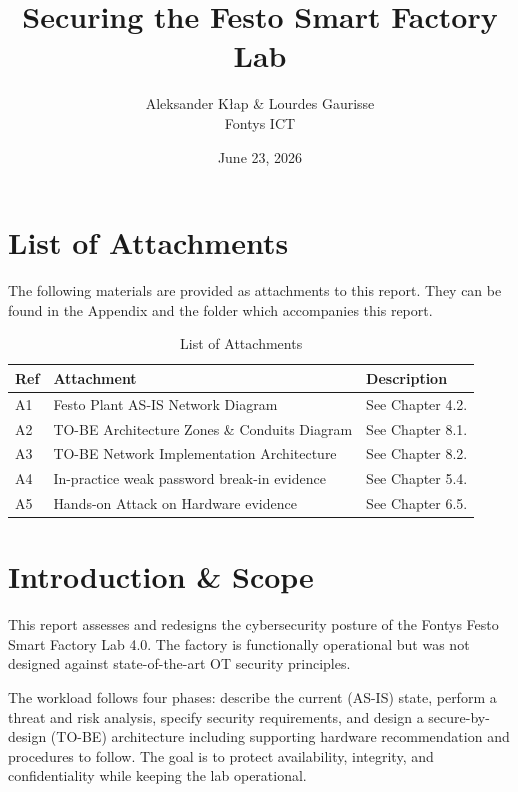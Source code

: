 \documentclass[11pt,a4paper]{article}
\title{\textbf{Securing the Festo Smart Factory Lab}\\[2pt]}
\author{Aleksander Kłap \& Lourdes Gaurisse\\Fontys ICT}
\date{June 23, 2026}
\begin{document}

\maketitle
\pagebreak
\tableofcontents
\listoftables
\listoffigures
\pagebreak
{}
\setcounter{page}{1}

\vspace{3em}
\section{List of Attachments}
The following materials are provided as attachments to this
report. They can be found in the Appendix and the folder which accompanies this report.
\begin{table}[H]
\centering
\setlength{\tabcolsep}{6pt}
\begin{tabular}{L{1.4cm} L{4.5cm} L{9cm}}
\toprule
\textbf{Ref} & \textbf{Attachment} & \textbf{Description} \\
\midrule
    A1 & Festo Plant AS-IS Network Diagram & See Chapter 4.2. \\

    A2 & TO-BE Architecture Zones \& Conduits Diagram & See Chapter 8.1. \\

    A3 & TO-BE Network Implementation Architecture & See Chapter 8.2. \\

    A4 & In-practice weak password break-in evidence & See Chapter 5.4. \\

    A5 & Hands-on Attack on Hardware evidence & See Chapter 6.5. \\

\bottomrule
\end{tabular}
    \caption{List of Attachments}
\end{table}
\pagebreak


\section{Introduction \& Scope}
This report assesses and redesigns the cybersecurity posture of the 
Fontys Festo Smart Factory Lab 4.0. The factory is functionally operational
but was not designed against state-of-the-art OT security principles.
\vspace{1em}

The workload follows four phases: describe the current (AS-IS) state, perform a
threat and risk analysis, specify security requirements, and design a
secure-by-design (TO-BE) architecture including supporting hardware
recommendation and procedures to follow. The goal is to protect availability,
integrity, and confidentiality while keeping the lab operational.
\end{document}
